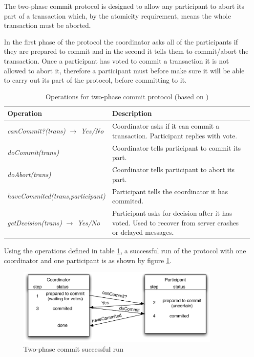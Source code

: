 The two-phase commit protocol is designed to allow any participant to abort its part of a transaction which, by the atomicity requirement, means the whole transaction must be aborted. 

In the first phase of the protocol the coordinator asks all of the participants if they are prepared to commit and in the second it tells them to commit/abort the transaction. Once a participant has voted to commit a transaction it is not allowed to abort it, therefore a participant must before make sure it will be able to carry out its part of the protocol, before committing to it. 

\begin{table}[h!]
\centering
  \begin{tabular}{  l  p{8cm}}
	\toprule
	Operation & Description\\
    \midrule
    \emph{canCommit?(trans) $\rightarrow$ Yes/No} & Coordinator asks if it can commit a transaction. Participant replies with vote.\\  
    \emph{doCommit(trans)} & Coordinator tells participant to commit its part.\\
    \emph{doAbort(trans)} & Coordinator tells participant to abort its part.\\
    \emph{haveCommited(trans,participant)} & Participant tells the coordinator it has commited.\\
    \emph{getDecision(trans) $\rightarrow$ Yes/No} & Participant asks for decision after it has voted. Used to recover from server crashes or delayed messages.\\
	\bottomrule
  \end{tabular}

\caption{Operations for two-phase commit protocol (based on \cite{coulouris2005distributed})}
\label{tab:2pc_ops}
\end{table}

Using the operations defined in table \ref{tab:2pc_ops}, a successful run of the protocol with one coordinator and one participant is as shown by figure \ref{fig:2pc_run}.

\begin{figure}[htb]
  \begin{center}
    \leavevmode
    \includegraphics[width=0.9\textwidth]{images/2pc}
  \end{center}
  \caption{Two-phase commit successful run\cite{coulouris2005distributed}}
  \label{fig:2pc_run}
\end{figure}

